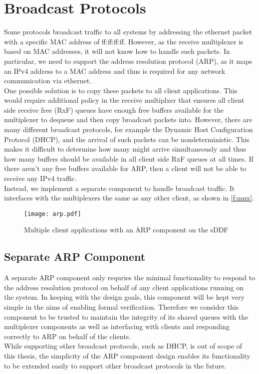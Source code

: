 \section{Broadcast Protocols}
Some protocols broadcast traffic to all systems by addressing the
ethernet packet with a specific MAC address of ff:ff:ff:ff. However,
as the receive multiplexer is based on MAC addresses, it will not
know how to handle such packets. In particular, we need to support 
the address resolution protocol (ARP), as it maps an
IPv4 address to a MAC address and thus 
is required for any network communication via ethernet.\\
One possible solution is to copy these packets to all client applications.
This would require additional policy in the receive multiplxer that ensures
all client side receive free (RxF) queues have enough free buffers available
for the multiplexer to dequeue and then copy broadcast packets into.
However, there are many different broadcast protocols, for example the Dynamic
Host Configuration Protocol (DHCP), and the arrival of such packets
can be nondeterministic. This makes it difficult to determine how many might arrive
simultaneously and thus how many buffers should be available in all client side
RxF queues at all times. If there aren't any free buffers available for ARP, then
a client will not be able to receive any IPv4 traffic.\\
Instead, we implement a separate component to handle broadcast traffic. It interfaces
with the multiplexers the same as any other client, as shown in \autoref{f:mux}. 

\begin{figure}[h]
    \centering
    \texttt{[image: arp.pdf]}
    \caption{Multiple client applications with an ARP component on the sDDF}
    \label{f:arp}
\end{figure}

\subsection{Separate ARP Component}
A separate ARP component only requries the minimal functionality to respond to 
the address resolution protocol on behalf of any client applications running on
the system. In keeping with the design goals, this component will be kept 
very simple in the aims of enabling formal verification. Therefore we consider
this component to be trusted to maintain the integrity of its shared queues with
the multiplexer components as well as interfacing with clients and responding
correctly to ARP on behalf of the clients. \\
While supporting other broadcast protocols, such as DHCP, is out of scope of this thesis, 
the simplicity of the ARP component design enables its functionality to be extended easily
to support other broadcast protocols in the future.

